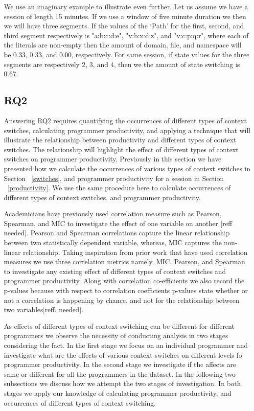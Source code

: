 We use an imaginary example to illustrate even further. 
Let us assume we have a session of length 15 minutes. 
If we use a window of five minute duration we then we will have three segments. 
If the values of the `Path' for the first, second, and third segment 
respectively is "a:b:c:d:e", "v:b:x:d:z", and "v:c:p:q:r", where each of the literals are non-empty then  the amount of domain, file, and namespace will be 
0.33, 0.33, and 0.00, respectively. For same session, if state values for the three segments are respectively 2, 3, and 4, then we the amount of state switching is 0.67.   

  


\subsection{RQ2}
\label{effect}
Answering RQ2 requires quantifying the occurrences of different types of context switches, calculating programmer productivity, and applying a technique that will illustrate the relationship between productivity and different types of context switches. The relationship will highlight the effect of different types of context switches on programmer productivity. Previously in this section we have presented how we calculate the occurrences of various types of context switches in Section ~\ref{switches}, and programmer productivity for a session in Section ~\ref{productivity}. We use the same procedure here to calculate occurrences of different types of context switches, and programmer productivity. 

Academicians have previously used correlation measure such as Pearson, Spearman, and MIC to investigate the effect of one variable on another [reff needed]. Pearson and Spearman correlations capture the linear relationship between two statistically dependent variable, whereas, MIC captures the non-linear relationship. Taking inspiration from prior work that have used correlation measures we use three correlation metrics namely, MIC, Pearson, and Spearman to investigate any existing effect of different types of context switches and programmer productivity. Along with correlation co-efficients 
we also record the p-values because with respect to 
correlation coefficients p-values state whether or not a correlation is happening by chance, and not for the relationship between two variables[reff. needed].      

As effects of different types of context switching can be different for different programmers we observe the necessity of conducting analysis in two stages considering the fact. In the first stage we focus on an individual programmer and investigate what are the effects of various context switches 
on different levels fo programmer productivity. In the second stage we investigate if 
the affects are same or different for all the programmers in the dataset. In the following two subsections we discuss how we attempt the two stages of investigation. 
In both stages we apply our knowledge of calculating programmer productivity, and occurrences of different types of context switching.
 
